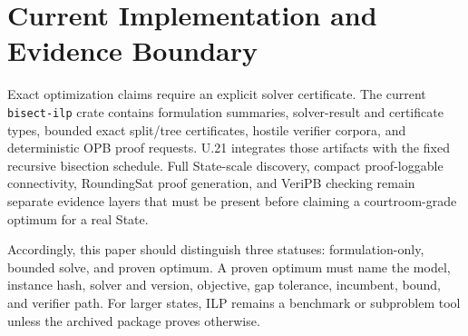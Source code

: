 \section{Current Implementation and Evidence Boundary}

Exact optimization claims require an explicit solver certificate.  The current
\texttt{bisect-ilp} crate contains formulation summaries, solver-result and
certificate types, bounded exact split/tree certificates, hostile verifier
corpora, and deterministic OPB proof requests. U.21 integrates those artifacts
with the fixed recursive bisection schedule. Full State-scale discovery,
compact proof-loggable connectivity, RoundingSat proof generation, and VeriPB
checking remain separate evidence layers that must be present before claiming
a courtroom-grade optimum for a real State.

Accordingly, this paper should distinguish three statuses: formulation-only,
bounded solve, and proven optimum.  A proven optimum must name the model,
instance hash, solver and version, objective, gap tolerance, incumbent, bound,
and verifier path.  For larger states, ILP remains a benchmark or subproblem
tool unless the archived package proves otherwise.
